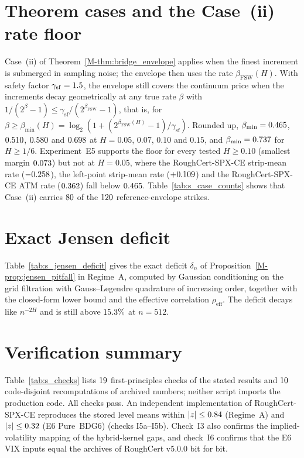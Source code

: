 \documentclass[11pt,a4paper]{article}
\newcommand{\mref}[1]{\ref*{M-#1}}
\newcommand{\RoughCert}{\textsf{RoughCert}}
\newcommand{\RCCE}{\textsf{RoughCert-SPX-CE}}
\begin{document}
\section{Theorem cases and the Case~(ii) rate floor}
\label{sec:s_case_ii}
Case~(ii) of Theorem~\mref{thm:bridge_envelope} applies when the finest increment is submerged in sampling noise; the envelope then uses the rate $\beta_{\mathrm{FSW}}(H)$. With safety factor $\gamma_{\mathrm{sf}}=1.5$, the envelope still covers the continuum price when the increments decay geometrically at any true rate $\beta$ with $1/(2^\beta-1)\le\gamma_{\mathrm{sf}}/(2^{\beta_{\mathrm{FSW}}}-1)$, that is, for $\beta\ge\beta_{\min}(H)=\log_2(1+(2^{\beta_{\mathrm{FSW}}(H)}-1)/\gamma_{\mathrm{sf}})$. Rounded up, $\beta_{\min}=0.465$, $0.510$, $0.580$ and $0.698$ at $H=0.05$, $0.07$, $0.10$ and $0.15$, and $\beta_{\min}=0.737$ for $H\ge1/6$. Experiment~E5 supports the floor for every tested $H\ge0.10$ (smallest margin $0.073$) but not at $H=0.05$, where the \RCCE{} strip-mean rate ($-0.258$), the left-point strip-mean rate ($+0.109$) and the \RCCE{} ATM rate ($0.362$) fall below $0.465$. Table~\ref{tab:s_case_counts} shows that Case~(ii) carries $80$ of the $120$ reference-envelope strikes.
%
\FloatBarrier

\section{Exact Jensen deficit}
\label{sec:s_jensen}
Table~\ref{tab:s_jensen_deficit} gives the exact deficit $\delta_n$ of Proposition~\mref{prop:jensen_pitfall} in Regime~A, computed by Gaussian conditioning on the grid filtration with Gauss--Legendre quadrature of increasing order, together with the closed-form lower bound and the effective correlation $\rho_{\mathrm{eff}}$. The deficit decays like $n^{-2H}$ and is still above $15.3\%$ at $n=512$.
%
\FloatBarrier

\section{Verification summary}
\label{sec:s_checks}
Table~\ref{tab:s_checks} lists $19$ first-principles checks of the stated results and $10$ code-disjoint recomputations of archived numbers; neither script imports the production code. All checks pass. An independent implementation of \RCCE{} reproduces the stored level means within $|z|\le0.84$ (Regime~A) and $|z|\le0.32$ (E6 Pure~BDG6) (checks I5a--I5b). Check~I3 also confirms the implied-volatility mapping of the hybrid-kernel gaps, and check~I6 confirms that the E6 VIX inputs equal the archives of \RoughCert{} v5.0.0 bit for bit.
%
\FloatBarrier
\end{document}
